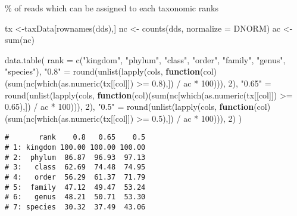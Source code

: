 \documentclass[
]{article}
\newenvironment{Shaded}{\begin{snugshade}}{\end{snugshade}}
\newcommand{\AttributeTok}[1]{\textcolor[rgb]{0.77,0.63,0.00}{#1}}
\newcommand{\ControlFlowTok}[1]{\textcolor[rgb]{0.13,0.29,0.53}{\textbf{#1}}}
\newcommand{\DecValTok}[1]{\textcolor[rgb]{0.00,0.00,0.81}{#1}}
\newcommand{\FloatTok}[1]{\textcolor[rgb]{0.00,0.00,0.81}{#1}}
\newcommand{\FunctionTok}[1]{\textcolor[rgb]{0.00,0.00,0.00}{#1}}
\newcommand{\NormalTok}[1]{#1}
\newcommand{\OtherTok}[1]{\textcolor[rgb]{0.56,0.35,0.01}{#1}}
\newcommand{\SpecialCharTok}[1]{\textcolor[rgb]{0.00,0.00,0.00}{#1}}
\newcommand{\StringTok}[1]{\textcolor[rgb]{0.31,0.60,0.02}{#1}}
\begin{document}
\% of reads which can be assigned to each taxonomic ranks

\begin{Shaded}
\begin{Highlighting}[]
\NormalTok{tx }\OtherTok{\textless{}{-}}\NormalTok{taxData[}\FunctionTok{rownames}\NormalTok{(dds),]}
\NormalTok{nc }\OtherTok{\textless{}{-}} \FunctionTok{counts}\NormalTok{(dds, }\AttributeTok{normalize =}\NormalTok{ DNORM)}
\NormalTok{ac }\OtherTok{\textless{}{-}} \FunctionTok{sum}\NormalTok{(nc)}

\FunctionTok{data.table}\NormalTok{(}
  \AttributeTok{rank =} \FunctionTok{c}\NormalTok{(}\StringTok{"kingdom"}\NormalTok{, }\StringTok{"phylum"}\NormalTok{, }\StringTok{"class"}\NormalTok{, }\StringTok{"order"}\NormalTok{, }\StringTok{"family"}\NormalTok{, }\StringTok{"genus"}\NormalTok{, }\StringTok{"species"}\NormalTok{),}
  \StringTok{"0.8"} \OtherTok{=} \FunctionTok{round}\NormalTok{(}\FunctionTok{unlist}\NormalTok{(}\FunctionTok{lapply}\NormalTok{(cols, }\ControlFlowTok{function}\NormalTok{(col)(}\FunctionTok{sum}\NormalTok{(nc[}\FunctionTok{which}\NormalTok{(}\FunctionTok{as.numeric}\NormalTok{(tx[[col]]) }\SpecialCharTok{\textgreater{}=} \FloatTok{0.8}\NormalTok{),]) }\SpecialCharTok{/}\NormalTok{ ac }\SpecialCharTok{*} \DecValTok{100}\NormalTok{))), }\DecValTok{2}\NormalTok{),}
  \StringTok{"0.65"} \OtherTok{=} \FunctionTok{round}\NormalTok{(}\FunctionTok{unlist}\NormalTok{(}\FunctionTok{lapply}\NormalTok{(cols, }\ControlFlowTok{function}\NormalTok{(col)(}\FunctionTok{sum}\NormalTok{(nc[}\FunctionTok{which}\NormalTok{(}\FunctionTok{as.numeric}\NormalTok{(tx[[col]]) }\SpecialCharTok{\textgreater{}=} \FloatTok{0.65}\NormalTok{),]) }\SpecialCharTok{/}\NormalTok{ ac }\SpecialCharTok{*} \DecValTok{100}\NormalTok{))), }\DecValTok{2}\NormalTok{),}
  \StringTok{"0.5"} \OtherTok{=} \FunctionTok{round}\NormalTok{(}\FunctionTok{unlist}\NormalTok{(}\FunctionTok{lapply}\NormalTok{(cols, }\ControlFlowTok{function}\NormalTok{(col)(}\FunctionTok{sum}\NormalTok{(nc[}\FunctionTok{which}\NormalTok{(}\FunctionTok{as.numeric}\NormalTok{(tx[[col]]) }\SpecialCharTok{\textgreater{}=} \FloatTok{0.5}\NormalTok{),]) }\SpecialCharTok{/}\NormalTok{ ac }\SpecialCharTok{*} \DecValTok{100}\NormalTok{))), }\DecValTok{2}\NormalTok{)}
\NormalTok{)}
\end{Highlighting}
\end{Shaded}

\begin{verbatim}
#       rank    0.8   0.65    0.5
# 1: kingdom 100.00 100.00 100.00
# 2:  phylum  86.87  96.93  97.13
# 3:   class  62.69  74.48  74.95
# 4:   order  56.29  61.37  71.79
# 5:  family  47.12  49.47  53.24
# 6:   genus  48.21  50.71  53.30
# 7: species  30.32  37.49  43.06
\end{verbatim}
\end{document}
